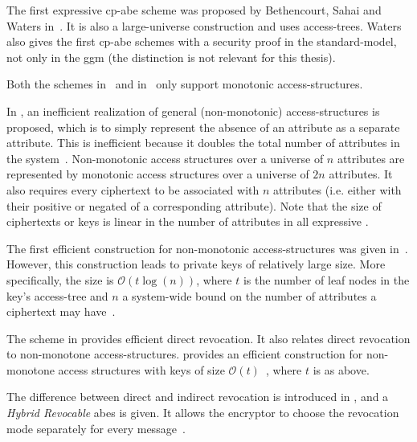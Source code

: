 The first expressive \acrshort{cp-abe} scheme was proposed by Bethencourt, Sahai and Waters in~\cite{bethencourt_ciphertext-policy_2007}.
It is also a large-universe construction and uses \glspl{access-tree}.
Waters \cite{waters_ciphertext-policy_2011} also gives the first \acrshort{cp-abe} schemes with a security proof in the \gls{standard-model}, not only in the \gls{ggm} (the distinction is not relevant for this thesis).

Both the schemes in~\cite{goyal_attribute-based_2006} and in~\cite{bethencourt_ciphertext-policy_2007} only support monotonic \glspl{access-structure}.

In \cite{goyal_attribute-based_2006}, an inefficient realization of general (non-monotonic) \glspl{access-structure} is proposed, which is to simply represent the absence of an attribute as a separate attribute.
This is inefficient because it doubles the total number of attributes in the system~\cite{goyal_attribute-based_2006}. 
Non-monotonic access structures over a universe of $n$ attributes are represented by monotonic access structures over a universe of $2n$ attributes.
It also requires every ciphertext to be associated with $n$ attributes (i.e. either with their positive or negated of a corresponding attribute).
Note that the size of ciphertexts or keys is linear in the number of attributes in all expressive . %

The first efficient construction for non-monotonic \glspl{access-structure} was given in~\cite{ostrovsky_attribute-based_2007}. 
However, this construction leads to private keys of relatively large size.
More specifically, the size is $\mathcal{O}(t \log(n))$, where $t$ is the number of leaf nodes in the key's \gls{access-tree} and $n$ a system-wide bound on the number of attributes a ciphertext may have~\cite{lewko_revocation_2008}. %

The scheme in \cite{lewko_revocation_2008} provides efficient direct revocation.
It also relates direct revocation to non-monotone \glspl{access-structure}.
\cite{lewko_revocation_2008} provides an efficient construction for non-monotone access structures with keys of size $\mathcal{O}(t)$~\cite{lewko_revocation_2008}, where $t$ is as above.

The difference between direct and indirect revocation is introduced in \cite{attrapadung_attribute-based_2009}, and a \emph{Hybrid Revocable} \acrshort{abes} is given.
It allows the encryptor to choose the revocation mode separately for every message~\cite{attrapadung_attribute-based_2009}.

